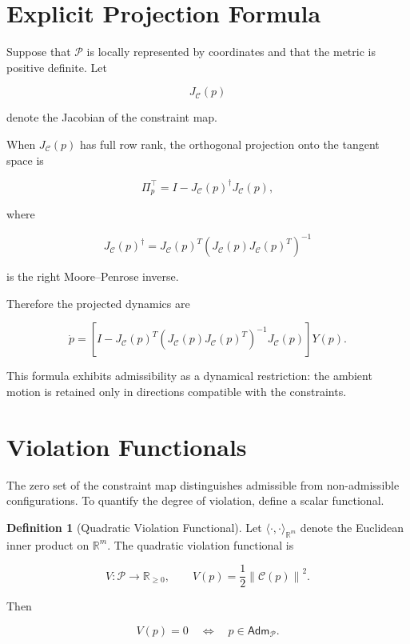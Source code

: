 \documentclass[11pt,oneside]{book}
\numberwithin{equation}{chapter}
\theoremstyle{definition}
\newtheorem{definition}{Definition}[chapter]
\theoremstyle{plain}
\newcommand{\Adm}{\mathsf{Adm}}
\begin{document}
\section{Explicit Projection Formula}

Suppose that \(\mathcal P\) is locally represented by coordinates and that
the metric is positive definite. Let

\[
J_{\mathcal C}(p)
\]

denote the Jacobian of the constraint map.

When \(J_{\mathcal C}(p)\) has full row rank, the orthogonal projection onto
the tangent space is

\[
\boxed{
\Pi_p^{\top}
=
I
-
J_{\mathcal C}(p)^{\dagger}
J_{\mathcal C}(p),
}
\]

where

\[
J_{\mathcal C}(p)^{\dagger}
=
J_{\mathcal C}(p)^{T}
\left(
J_{\mathcal C}(p)
J_{\mathcal C}(p)^{T}
\right)^{-1}
\]

is the right Moore--Penrose inverse.

Therefore the projected dynamics are

\[
\boxed{
\dot p
=
\left[
I
-
J_{\mathcal C}(p)^{T}
\left(
J_{\mathcal C}(p)
J_{\mathcal C}(p)^{T}
\right)^{-1}
J_{\mathcal C}(p)
\right]
Y(p).
}
\]

This formula exhibits admissibility as a dynamical restriction: the ambient
motion is retained only in directions compatible with the constraints.

\section{Violation Functionals}

The zero set of the constraint map distinguishes admissible from
non-admissible configurations. To quantify the degree of violation, define a
scalar functional.

\begin{definition}[Quadratic Violation Functional]

Let \(\langle\cdot,\cdot\rangle_{\mathbb R^m}\) denote the Euclidean inner
product on \(\mathbb R^m\). The quadratic violation functional is

\[
V:\mathcal P\longrightarrow\mathbb R_{\geq 0},
\qquad
V(p)
=
\frac12
\left\|
\mathcal C(p)
\right\|^2.
\]

\end{definition}

Then

\[
V(p)=0
\quad\Longleftrightarrow\quad
p\in\Adm_{\mathcal P}.
\]
\end{document}

